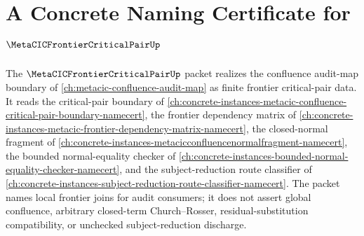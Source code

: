 \chapter{A Concrete Naming Certificate for $\MetaCICFrontierCriticalPairUp$}
\label{ch:concrete-instances-metacic-frontier-critical-pair-namecert}

The $\MetaCICFrontierCriticalPairUp$ packet realizes the confluence audit-map boundary of \autoref{ch:metacic-confluence-audit-map} as finite frontier critical-pair data. It reads the critical-pair boundary of \autoref{ch:concrete-instances-metacic-confluence-critical-pair-boundary-namecert}, the frontier dependency matrix of \autoref{ch:concrete-instances-metacic-frontier-dependency-matrix-namecert}, the closed-normal fragment of \autoref{ch:concrete-instances-metacicconfluencenormalfragment-namecert}, the bounded normal-equality checker of \autoref{ch:concrete-instances-bounded-normal-equality-checker-namecert}, and the subject-reduction route classifier of \autoref{ch:concrete-instances-subject-reduction-route-classifier-namecert}. The packet names local frontier joins for audit consumers; it does not assert global confluence, arbitrary closed-term Church--Rosser, residual-substitution compatibility, or unchecked subject-reduction discharge.



